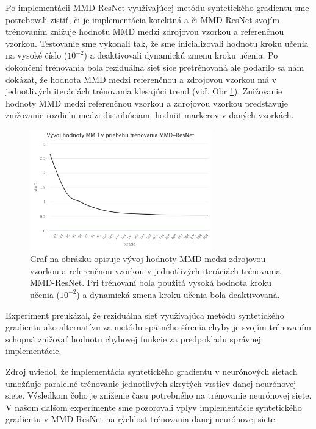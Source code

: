 Po implementácii MMD-ResNet využívajúcej metódu syntetického gradientu sme potrebovali zistiť, či je implementácia korektná a či MMD-ResNet svojím trénovaním znižuje hodnotu MMD medzi zdrojovou vzorkou a referenčnou vzorkou. Testovanie sme vykonali tak, že sme inicializovali hodnotu kroku učenia na vysoké číslo ($10^{-2}$) a deaktivovali dynamickú zmenu kroku učenia. Po dokončení trénovania bola reziduálna sieť síce pretrénovaná ale podarilo sa nám dokázať, že hodnota MMD medzi referenčnou a zdrojovou vzorkou má v jednotlivých iteráciách trénovania klesajúci trend (viď. Obr \ref{vysledok1}). Znižovanie hodnoty MMD medzi referenčnou vzorkou a zdrojovou vzorkou predstavuje znižovanie rozdielu medzi distribúciami hodnôt markerov v daných vzorkách.

\begin{figure}
\centerline{\includegraphics[width=0.7\textwidth]{images/experimenty/experiment1.png}}
\caption[Vývoj hodnoty MMD v priebehu trénovania MMD-ResNet]{Graf na obrázku opisuje vývoj hodnoty MMD medzi zdrojovou vzorkou a referenčnou vzorkou v jednotlivých iteráciách trénovania MMD-ResNet. Pri trénovaní bola použitá vysoká hodnota kroku učenia ($10^{-2}$) a dynamická zmena kroku učenia bola deaktivovaná.}
\label{vysledok1}
\end{figure}

Experiment preukázal, že reziduálna sieť využívajúca metódu syntetického gradientu ako alternatívu za metódu spätného šírenia chyby je svojím trénovaním schopná znižovať hodnotu chybovej funkcie za predpokladu správnej implementácie.

Zdroj \cite{Jaderberg2016} uviedol, že implementácia syntetického gradientu v neurónových sieťach umožňuje paralelné trénovanie jednotlivých skrytých vrstiev danej neurónovej siete. Výsledkom čoho je zníženie času potrebného na trénovanie neurónovej siete. V našom ďalšom experimente sme pozorovali vplyv implementácie syntetického gradientu v MMD-ResNet na rýchlosť trénovania danej neurónovej siete. 

